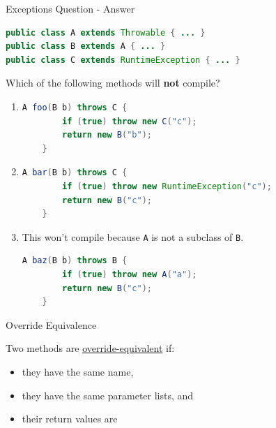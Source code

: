 \documentclass{beamer}
\begin{document}
\begin{frame}[fragile]{Exceptions Question - Answer}

\vspace{-.05in}
\begin{lstlisting}[language=Java]
public class A extends Throwable { ... }
public class B extends A { ... }
public class C extends RuntimeException { ... }
\end{lstlisting}
\vspace{-.05in}
Which of the following methods will {\bf not} compile?
\vspace{-.05in}
\begin{enumerate} \itemsep0pt
\item
\begin{lstlisting}[language=Java]
    A foo(B b) throws C {
        if (true) throw new C("c");
        return new B("b");
    }
\end{lstlisting}

\item
\begin{lstlisting}[language=Java]
    A bar(B b) throws C {
        if (true) throw new RuntimeException("c");
        return new B("c");
    }
\end{lstlisting}

\item This won't compile because {\tt A} is not a subclass of {\tt B}.
\begin{lstlisting}[language=Java]
    A baz(B b) throws B {
        if (true) throw new A("a");
        return new B("c");
    }
\end{lstlisting}


\end{enumerate}



\end{frame}


\begin{frame}[fragile]{Override Equivalence}

Two methods are \href{http://docs.oracle.com/javase/specs/jls/se8/html/jls-8.html#jls-8.4.2}{override-equivalent} if:
\begin{itemize}
\item they have the same name,
\item they have the same parameter lists, and
\item their return values are 
\end{itemize}

\end{frame}
\end{document}
